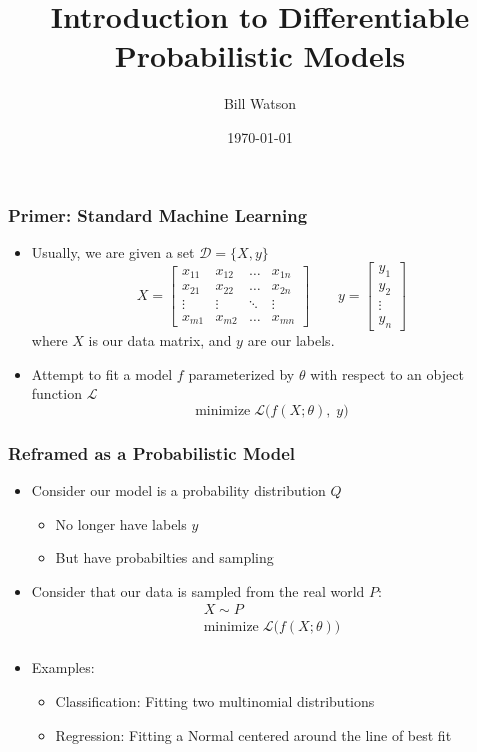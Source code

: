 \documentclass{beamer}
\title{Introduction to Differentiable Probabilistic Models}
\author{Bill Watson}
\date{\today}
\begin{document}
\begin{frame}
\titlepage
\end{frame}


\begin{frame}
\frametitle{Primer: Standard Machine Learning}
\begin{itemize}
\item Usually, we are given a set $\mathcal{D} = \{ X, y\}$
  \begin{equation*}
  X =
    \begin{bmatrix}
        x_{11} & x_{12} & \dots  & x_{1n} \\
        x_{21} & x_{22} & \dots  & x_{2n} \\
        \vdots & \vdots & \ddots & \vdots \\
        x_{m1} & x_{m2} & \dots  & x_{mn}
    \end{bmatrix}
    \quad \quad
    y =
    \begin{bmatrix}
      y_1 \\
      y_2 \\
      \vdots \\
      y_n
    \end{bmatrix}
  \end{equation*}
  where $X$ is our data matrix, and $y$ are our labels.
\pause
\item Attempt to fit a model $f$ parameterized by $\theta$ with respect to
an object function $\mathcal{L}$
\begin{equation*}
  \text{minimize} \; \mathcal{L} \big( f( X;\theta), \; y \big)
\end{equation*}
\end{itemize}
\end{frame}


\begin{frame}
\frametitle{Reframed as a Probabilistic Model}
\begin{itemize}
\item Consider our model is a probability distribution $Q$
\begin{itemize}
  \item No longer have labels $y$
  \item But have probabilties and sampling
\end{itemize}
\pause
\item Consider that our data is sampled from the real world $P$:
\begin{equation*}
  \begin{gathered}
  X \sim P \\
  \text{minimize} \; \mathcal{L} \big( f(X;\theta) \big) \\
\end{gathered}
\end{equation*}
\pause
\item Examples:
\begin{itemize}
  \item Classification: Fitting two multinomial distributions
  \item Regression: Fitting a Normal centered around the line of best fit
\end{itemize}
\end{itemize}
\end{frame}
\end{document}
